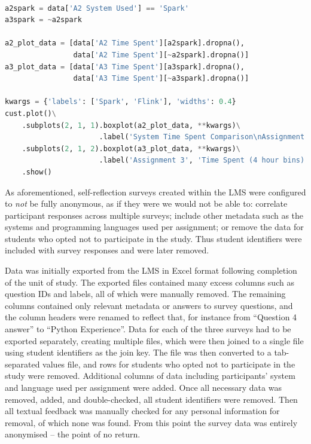   \begin{lstlisting}[float=ht,
                     language=Python,
                     basicstyle=\ttfamily\footnotesize,
                     label=CUST_PLOT_COMPLEX,
                     caption={Usage of pandas and custom plotting functions in drawing a pair of box and whisker plots -- specifically that for Figure~\ref{ASSIGNMENT_SYSTEM_TIME_BOX}.}]

a2spark = data['A2 System Used'] == 'Spark'
a3spark = ~a2spark

a2_plot_data = [data['A2 Time Spent'][a2spark].dropna(),
                data['A2 Time Spent'][~a2spark].dropna()]
a3_plot_data = [data['A3 Time Spent'][a3spark].dropna(),
                data['A3 Time Spent'][~a3spark].dropna()]

kwargs = {'labels': ['Spark', 'Flink'], 'widths': 0.4}
cust.plot()\
    .subplots(2, 1, 1).boxplot(a2_plot_data, **kwargs)\
                      .label('System Time Spent Comparison\nAssignment 2')\
    .subplots(2, 1, 2).boxplot(a3_plot_data, **kwargs)\
                      .label('Assignment 3', 'Time Spent (4 hour bins)')\
    .show()
  \end{lstlisting}

  As aforementioned, self-reflection surveys created within the LMS were configured to \emph{not} be fully anonymous, as if they were we would not be able to: correlate participant responses across multiple surveys; include other metadata such as the systems and programming languages used per assignment; or remove the data for students who opted not to participate in the study. Thus student identifiers were included with survey responses and were later removed.
  
  Data was initially exported from the LMS in Excel format following completion of the unit of study. The exported files contained many excess columns such as question IDs and labels, all of which were manually removed. The remaining columns contained only relevant metadata or answers to survey questions, and the column headers were renamed to reflect that, for instance from ``Question 4 answer'' to ``Python Experience''. Data for each of the three surveys had to be exported separately, creating multiple files, which were then joined to a single file using student identifiers as the join key. The file was then converted to a tab-separated values file, and rows for students who opted not to participate in the study were removed. Additional columns of data including participants' system and language used per assignment were added. Once all necessary data was removed, added, and double-checked, all student identifiers were removed. Then all textual feedback was manually checked for any personal information for removal, of which none was found. From this point the survey data was entirely anonymised -- the point of no return.
  

